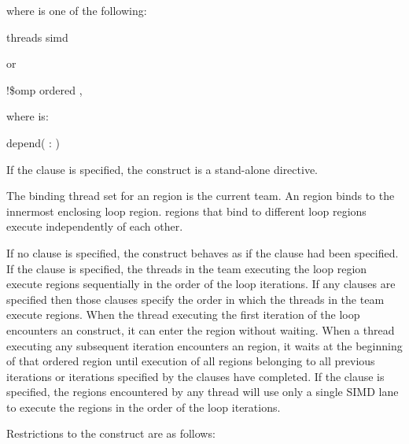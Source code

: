 where  is one of the following:
\begin{indentedcodelist}
threads
simd
\end{indentedcodelist}

or

\begin{boxedcode}
!\$omp ordered \plc{clause [[[},\plc{] clause] ... ]}
\end{boxedcode}

where  is:
\begin{indentedcodelist}
depend( \plc{[}: \plc{vec]})
\end{indentedcodelist}
\fortranspecificend

If the  clause is specified, the  construct is a stand-alone directive.
 
\binding
The binding thread set for an  region is the current team. An  region 
binds to the innermost enclosing loop region.  regions that bind to different 
loop regions execute independently of each other.

\descr
If no clause is specified, the  construct behaves as if the  clause had been specified. If the  clause is specified, the threads in the team executing the loop region execute  regions sequentially in the order of the loop iterations. If any  clauses are specified then those clauses specify the order in which the threads in the team execute  regions. When the thread executing the first iteration of the loop encounters an  construct, it can enter the  region without waiting. When a thread executing any subsequent iteration encounters an  region, it waits at the beginning of that ordered region until execution of all  regions belonging to all previous iterations or iterations specified by the  clauses have completed. If the  clause is specified, the  regions encountered by any thread will use only a single SIMD lane to execute the  regions in the order of the loop iterations.

\restrictions
Restrictions to the  construct are as follows:


